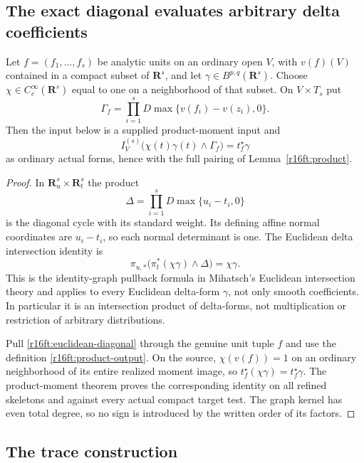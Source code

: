 \subsection{The exact diagonal evaluates arbitrary delta coefficients}

\begin{lemma}
\label{r16ft:graph}
Let $f=(f_1,\ldots,f_s)$ be analytic units on an ordinary open $V$,
with $v(f)(V)$ contained in a compact subset of $\mathbf R^s$, and let
$\gamma\in B^{p,q}(\mathbf R^s)$. Choose
$\chi\in C_c^\infty(\mathbf R^s)$ equal to one on a neighborhood of
that subset. On $V\times T_s$ put
\[
 \Gamma_f=\prod_{i=1}^sD\max\{v(f_i)-v(z_i),0\}.
\]
Then the input below is a supplied product-moment input and
\[
 I^{(s)}_V\bigl(\chi(t)\gamma(t)\wedge\Gamma_f\bigr)
                      =t_f^\star\gamma
 \tag{FT16.5}\label{r16ft:graph-evaluation}
\]
as ordinary actual forms, hence with the full pairing of
Lemma~\ref{r16ft:product}.
\end{lemma}

\begin{proof}
In $\mathbf R^s_u\times\mathbf R^s_t$ the product
\[
 \Delta=\prod_{i=1}^sD\max\{u_i-t_i,0\}
\]
is the diagonal cycle with its standard weight. Its defining affine
normal coordinates are $u_i-t_i$, so each normal determinant is one.
The Euclidean delta intersection identity is
\[
 \pi_{u,*}\bigl(\pi_t^*(\chi\gamma)\wedge\Delta\bigr)
                         =\chi\gamma.
 \tag{FT16.6}\label{r16ft:euclidean-diagonal}
\]
This is the identity-graph pullback formula in Mihatsch's Euclidean
intersection theory and applies to every Euclidean delta-form
$\gamma$, not only smooth coefficients. In particular it is an
intersection product of delta-forms, not multiplication or restriction
of arbitrary distributions.

Pull \eqref{r16ft:euclidean-diagonal} through the genuine unit tuple
$f$ and use the definition \eqref{r16ft:product-output}. On the source,
$\chi(v(f))=1$ on an ordinary neighborhood of its entire realized
moment image, so $t_f^\star(\chi\gamma)=t_f^\star\gamma$.
The product-moment theorem proves the corresponding identity on all
refined skeletons and against every actual compact target test. The
graph kernel has even total degree, so no sign is introduced by the
written order of its factors.
\end{proof}

\subsection{The trace construction}

